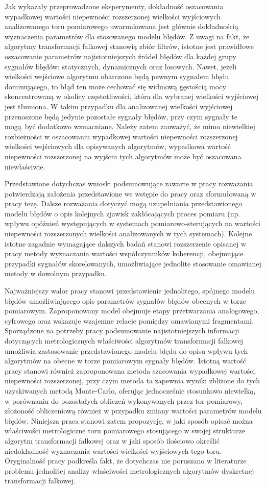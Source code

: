 Jak wykazały przeprowadzone eksperymenty, dokładność oszacowania wypadkowej wartości niepewności rozszerzonej wielkości wyjściowych analizowanego toru pomiarowego uwarunkowana jest głównie dokładnością wyznaczenia parametrów dla stosowanego modelu błędów. Z uwagi na fakt, że algorytmy transformacji falkowej stanowią zbiór filtrów, istotne jest prawidłowe oszacowanie parametrów najistotniejszych źródeł błędów dla każdej grupy sygnałów błędów: statycznych, dynamicznych oraz losowych. Nawet, jeżeli wielkości wejściowe algorytmu obarczone będą pewnym sygnałem błędu dominującego, to błąd ten może cechować się widmową gęstością mocy skoncentrowaną w okolicy częstotliwości, która dla wybranej wielkości wyjściowej jest tłumiona. W takim przypadku dla analizowanej wielkości wyjściowej przenoszone będą jedynie pozostałe sygnały błędów, przy czym sygnały te mogą być dodatkowo wzmacniane. Należy zatem zauważyć, że mimo niewielkiej rozbieżności w oszacowaniu wypadkowej wartości niepewności rozszerzonej wielkości wejściowych dla opisywanych algorytmów, wypadkowa wartość niepewności rozszerzonej na wyjściu tych algorytmów może być oszacowana niewłaściwie.

Przedstawione dotychczas wnioski podsumowujące zawarte w pracy rozważania potwierdzają założenia przedstawione we wstępie do pracy oraz sformułowaną w pracy tezę. Dalsze rozważania dotyczyć mogą uzupełniania przedstawionego modelu błędów o opis kolejnych zjawisk zakłócających proces pomiaru (np. wpływu opóźnień występujących w systemach pomiarowo-sterujących na wartości niepewności rozszerzonych wielkości analizowanych w tych systemach). Kolejne istotne zagadnie wymagające dalszych badań stanowi rozszerzenie opisanej w pracy metody wyznaczania wartości współczynników koherencji, obejmujące przypadki sygnałów skorelowanych, umożliwiające jednolite stosowanie omawianej metody w dowolnym przypadku.

Najważniejszy walor pracy stanowi przedstawienie jednolitego, spójnego modelu błędów umożliwiającego opis parametrów sygnałów błędów obecnych w torze pomiarowym. Zaproponowany model obejmuje etapy przetwarzania analogowego, cyfrowego oraz wskazuje wzajemne relacje pomiędzy omawianymi fragmentami. Sporządzone na potrzeby pracy podsumowanie najistotniejszych informacji dotyczących metrologicznych właściwości algorytmów transformacji falkowej umożliwia zastosowanie przedstawionego modelu błędu do opisu wpływu tych algorytmów na obecne w torze pomiarowym sygnały błędów. Istotną wartość pracy stanowi również zaproponowana metoda szacowania wypadkowej wartości niepewności rozszerzonej, przy czym metoda ta zapewnia wyniki zbliżone do tych uzyskiwanych metodą Monte-Carlo, oferując jednocześnie stosunkowo niewielką, w porównaniu do pozostałych obliczeń wykonywanych przez tor pomiarowy, złożoność obliczeniową również w przypadku zmiany wartości parametrów modelu błędów. Niniejsza praca stanowi zatem propozycję, w jaki sposób opisać można właściwości metrologiczne toru pomiarowego stosującego w swojej strukturze algorytm transformacji falkowej oraz w jaki sposób ilościowo określić niedokładność wyznaczania wartości wielkości wyjściowych tego toru. Oryginalność pracy podkreśla fakt, że dotychczas nie poruszano w literaturze problemu jednolitej analizy właściwości metrologicznych algorytmów dyskretnej transformacji falkowej.
